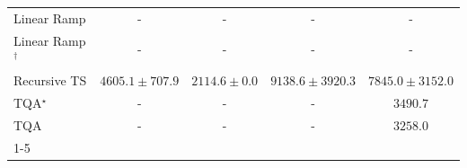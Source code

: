 \begin{tabular}{l|cccc|}
Linear Ramp & {\cellcolor[HTML]{000000}} \color[HTML]{F1F1F1} {\cellcolor{white}} \color{black} - & {\cellcolor[HTML]{000000}} \color[HTML]{F1F1F1} {\cellcolor{white}} \color{black} - & {\cellcolor[HTML]{000000}} \color[HTML]{F1F1F1} {\cellcolor{white}} \color{black} - & {\cellcolor[HTML]{000000}} \color[HTML]{F1F1F1} {\cellcolor{white}} \color{black} - \\
Linear Ramp$^\dagger$ & {\cellcolor[HTML]{000000}} \color[HTML]{F1F1F1} {\cellcolor{white}} \color{black} - & {\cellcolor[HTML]{000000}} \color[HTML]{F1F1F1} {\cellcolor{white}} \color{black} - & {\cellcolor[HTML]{000000}} \color[HTML]{F1F1F1} {\cellcolor{white}} \color{black} - & {\cellcolor[HTML]{000000}} \color[HTML]{F1F1F1} {\cellcolor{white}} \color{black} - \\
Recursive TS & {\cellcolor[HTML]{9EBAD9}} \color[HTML]{000000} $4605.1\pm 707.9$ & {\cellcolor[HTML]{F5EFF6}} \color[HTML]{000000} $2114.6\pm 0.0$ & {\cellcolor[HTML]{023858}} \color[HTML]{F1F1F1} $9138.6\pm 3920.3$ & {\cellcolor[HTML]{04629A}} \color[HTML]{F1F1F1} $7845.0\pm 3152.0$ \\
TQA$^\star$ & {\cellcolor[HTML]{000000}} \color[HTML]{F1F1F1} {\cellcolor{white}} \color{black} - & {\cellcolor[HTML]{000000}} \color[HTML]{F1F1F1} {\cellcolor{white}} \color{black} - & {\cellcolor[HTML]{000000}} \color[HTML]{F1F1F1} {\cellcolor{white}} \color{black} - & {\cellcolor[HTML]{D1D2E6}} \color[HTML]{000000} $3490.7$ \\
TQA & {\cellcolor[HTML]{000000}} \color[HTML]{F1F1F1} {\cellcolor{white}} \color{black} - & {\cellcolor[HTML]{000000}} \color[HTML]{F1F1F1} {\cellcolor{white}} \color{black} - & {\cellcolor[HTML]{000000}} \color[HTML]{F1F1F1} {\cellcolor{white}} \color{black} - & {\cellcolor[HTML]{D8D7E9}} \color[HTML]{000000} $3258.0$ \\
\cline{1-5}
\bottomrule
\end{tabular}
